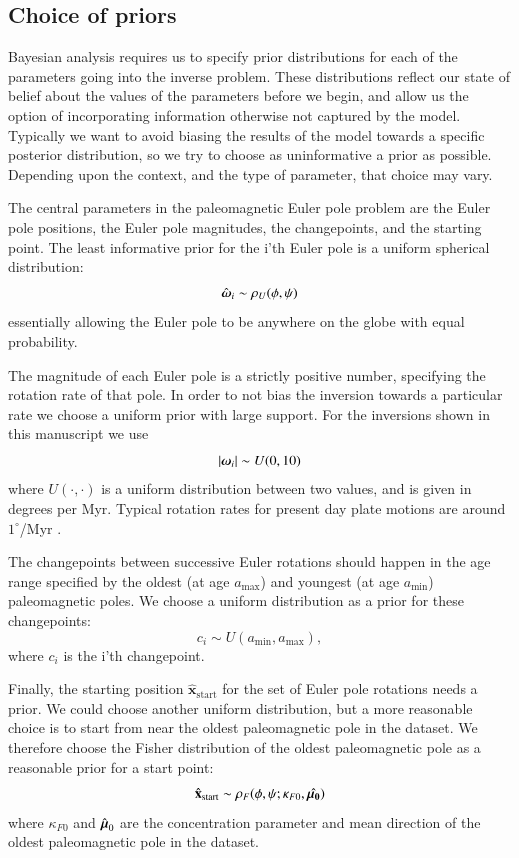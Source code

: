 \documentclass[preprint,12pt,authoryear]{elsarticle}
\newcommand{\mitbf}[1]{\hbox{\mathversion{bold}$#1$}}
\begin{document}
\subsection{Choice of priors}

Bayesian analysis requires us to specify prior distributions for each of the parameters going into the inverse problem.
These distributions reflect our state of belief about the values of the parameters before we begin,
and allow us the option of incorporating information otherwise not captured by the model.
Typically we want to avoid biasing the results of the model towards a specific posterior distribution,
so we try to choose as uninformative a prior as possible. Depending upon the context, and the type
of parameter, that choice may vary.

The central parameters in the paleomagnetic Euler pole problem are the Euler pole positions,
the Euler pole magnitudes, the changepoints, and the starting point. 
The least informative prior for the i'th Euler pole is a uniform spherical distribution:
\begin{equation}
\hat{\mitbf{\omega}}_i \sim \rho_U(\phi, \psi)
\end{equation}
essentially allowing the Euler pole to be anywhere on the globe with equal probability.

The magnitude of each Euler pole is a strictly positive number, specifying the
rotation rate of that pole. In order to not bias the inversion towards a particular
rate we choose a uniform prior with large support. For the inversions shown in
this manuscript we use
\begin{equation}
\vert \mitbf{\omega}_i \vert \sim U(0, 10)
\end{equation}
where $U(\cdot, \cdot)$ is a uniform distribution between two values, and is given
in degrees per Myr. Typical rotation rates for present day plate motions
are around $1^\circ$/Myr \citep{argus2011geologically}.

The changepoints between successive Euler rotations should happen in the age
range specified by the oldest (at age $a_\mathrm{max}$) and youngest (at age $a_\mathrm{min}$)
paleomagnetic poles. We choose a uniform distribution as a prior for these changepoints:
\begin{equation}
c_i \sim U( a_\mathrm{min}, a_\mathrm{max}),
\end{equation}
where $c_i$ is the i'th changepoint.

Finally, the starting position $\hat{\mathbf{x}}_\mathrm{start}$ for the set of Euler pole rotations needs a prior.
We could choose another uniform distribution, but a more reasonable choice
is to start from near the oldest paleomagnetic pole in the dataset.
We therefore choose the Fisher distribution of the oldest paleomagnetic pole as a reasonable prior for a start point:
\begin{equation}
\hat{\mathbf{x}}_\mathrm{start} \sim \rho_F(\phi, \psi; \kappa_{F0}, \hat{\mitbf{\mu_0}})
\end{equation}
where $\kappa_{F0}$ and $\hat{\mitbf{\mu}}_0$ are the concentration parameter and mean direction
of the oldest paleomagnetic pole in the dataset.
\end{document}
